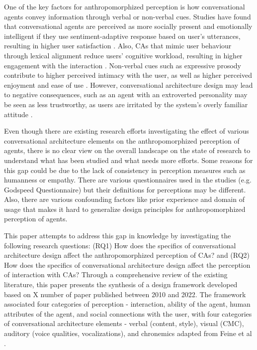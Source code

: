 \documentclass[sigconf,screen,review, anonymous]{acmart}
\begin{document}
One of the key factors for anthropomorphized perception is how conversational agents convey information through verbal or non-verbal cues. Studies have found that conversational agents are perceived as more socially present and emotionally intelligent if they use sentiment-adaptive response based on user's utterances, resulting in higher user satisfaction \cite{diederich2019emulating} \cite{yang2017perceived}. Also, CAs that mimic user behaviour through lexical alignment reduce users' cognitive workload, resulting in higher engagement with the interaction \cite{spillner2021talk}. Non-verbal cues such as expressive prosody contribute to higher perceived intimacy with the user, as well as higher perceived enjoyment and ease of use \cite{kim2020can}. However, conversational architecture design may lead to negative consequences, such as an agent with an extroverted personality may be seen as less trustworthy, as users are irritated by the system's overly familiar attitude \cite{andrews2012system}.

Even though there are existing research efforts investigating the effect of various conversational architecture elements on the anthropomorphized perception of agents, there is no clear view on the overall landscape on the state of research to understand what has been studied and what needs more efforts. Some reasons for this gap could be due to the lack of consistency in perception measures such as humanness or empathy. There are various questionnaires used in the studies (e.g. Godspeed Questionnaire) but their definitions for perceptions may be different. Also, there are various confounding factors like prior experience and domain of usage that makes it hard to generalize design principles for anthropomorphized perception of agents.

This paper attempts to address this gap in knowledge by investigating the following research questions: (RQ1) How does the specifics of conversational architecture design affect the anthropomorphized perception of CAs? and (RQ2) How does the specifics of conversational architecture design affect the perception of interaction with CAs? Through a comprehensive review of the existing literature, this paper presents the synthesis of a design framework developed based on X number of paper published between 2010 and 2022. The framework associated four categories of perception - interaction, ability of the agent, human attributes of the agent, and social connections with the user, with four categories of conversational architecture elements - verbal (content, style), visual (CMC), auditory (voice qualities, vocalizations), and chronemics adapted from Feine et al \cite{feine2019taxonomy}.
\end{document}
